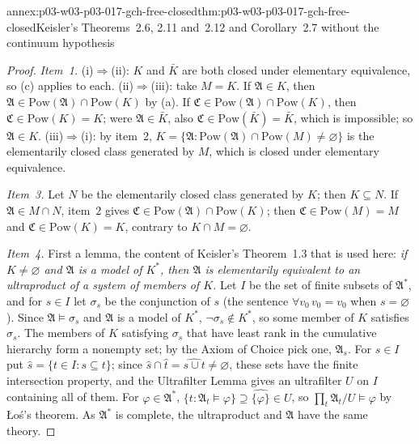 \begin{annexitem}{annex:p03-w03-p03-017-gch-free-closed}{thm:p03-w03-p03-017-gch-free-closed}{Keisler's Theorems~2.6, 2.11 and~2.12 and Corollary~2.7 without the continuum hypothesis}
\begin{proof}
\emph{Item~1.}  (i)\(\Rightarrow\)(ii): \(K\) and \(\bar K\) are both
closed under elementary equivalence, so (c) applies to each.
(ii)\(\Rightarrow\)(iii): take \(M=K\).  If \(\mathfrak A\in K\), then
\(\mathfrak A\in\mathrm{Pow}(\mathfrak A)\cap\mathrm{Pow}(K)\) by (a).  If
\(\mathfrak C\in\mathrm{Pow}(\mathfrak A)\cap\mathrm{Pow}(K)\), then
\(\mathfrak C\in\mathrm{Pow}(K)=K\); were \(\mathfrak A\in\bar K\), also
\(\mathfrak C\in\mathrm{Pow}(\bar K)=\bar K\), which is impossible; so
\(\mathfrak A\in K\).  (iii)\(\Rightarrow\)(i): by item~2,
\(K=\{\mathfrak A:\mathrm{Pow}(\mathfrak A)\cap\mathrm{Pow}(M)\neq
\varnothing\}\) is the elementarily closed class generated by \(M\), which
is closed under elementary equivalence.

\emph{Item~3.}  Let \(N\) be the elementarily closed class generated by
\(K\); then \(K\subseteq N\).  If \(\mathfrak A\in M\cap N\), item~2 gives
\(\mathfrak C\in\mathrm{Pow}(\mathfrak A)\cap\mathrm{Pow}(K)\); then
\(\mathfrak C\in\mathrm{Pow}(M)=M\) and \(\mathfrak C\in\mathrm{Pow}(K)=K\),
contrary to \(K\cap M=\varnothing\).

\emph{Item~4.}  First a lemma, the content of Keisler's Theorem~1.3 that is
used here: \emph{if \(K\neq\varnothing\) and \(\mathfrak A\) is a model of
\(K^*\), then \(\mathfrak A\) is elementarily equivalent to an ultraproduct
of a system of members of \(K\).}  Let \(I\) be the set of finite subsets of
\(\mathfrak A^*\), and for \(s\in I\) let \(\sigma_s\) be the conjunction of
\(s\) (the sentence \(\forall v_0\,v_0=v_0\) when \(s=\varnothing\)).  Since
\(\mathfrak A\models\sigma_s\) and \(\mathfrak A\) is a model of \(K^*\),
\(\neg\sigma_s\notin K^*\), so some member of \(K\) satisfies \(\sigma_s\).
The members of \(K\) satisfying \(\sigma_s\) that have least rank in the
cumulative hierarchy form a nonempty set; by the Axiom of Choice pick one,
\(\mathfrak A_s\).  For \(s\in I\) put \(\hat s=\{t\in I:s\subseteq t\}\);
since \(\hat s\cap\hat t=\widehat{s\cup t}\neq\varnothing\), these sets have
the finite intersection property, and the Ultrafilter Lemma gives an
ultrafilter \(U\) on \(I\) containing all of them.  For
\(\varphi\in\mathfrak A^*\), \(\{t:\mathfrak A_t\models\varphi\}\supseteq
\widehat{\{\varphi\}}\in U\), so \(\prod_t\mathfrak A_t/U\models\varphi\) by
\L o\'s's theorem.  As \(\mathfrak A^*\) is complete, the ultraproduct and
\(\mathfrak A\) have the same theory.


\end{proof}
\end{annexitem}
